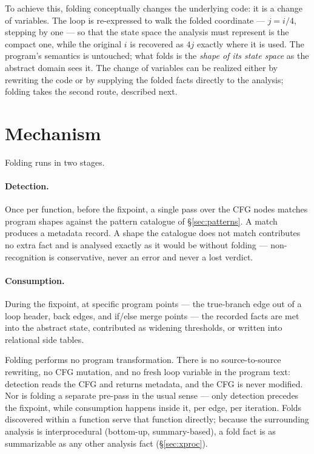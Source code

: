\documentclass[11pt,a4paper]{article}
\begin{document}
To achieve this, folding conceptually changes the underlying code: it is a change of
variables. The loop is re-expressed to walk the folded coordinate --- $j = i/4$, stepping
by one --- so that the state space the analysis must represent is the compact one, while
the original $i$ is recovered as $4j$ exactly where it is used. The program's semantics is
untouched; what folds is the \emph{shape of its state space} as the abstract domain sees
it. The change of variables can be realized either by rewriting the code or by supplying
the folded facts directly to the analysis; folding takes the second route, described next.

\section{Mechanism}
\label{sec:mechanism}

Folding runs in two stages.

\paragraph{Detection.} Once per function, before the fixpoint, a single pass over the CFG
nodes matches program shapes against the pattern catalogue of \S\ref{sec:patterns}. A
match produces a metadata record. A shape the catalogue does not match contributes no
extra fact and is analysed exactly as it would be without folding --- non-recognition is
conservative, never an error and never a lost verdict.

\paragraph{Consumption.} During the fixpoint, at specific program points --- the
true-branch edge out of a loop header, back edges, and if/else merge points --- the
recorded facts are met into the abstract state, contributed as widening thresholds, or
written into relational side tables.

Folding performs no program transformation. There is no source-to-source rewriting, no
CFG mutation, and no fresh loop variable in the program text: detection reads the CFG
and returns metadata, and the CFG is never modified. Nor is
folding a separate pre-pass in the usual sense --- only detection precedes the fixpoint,
while consumption happens inside it, per edge, per iteration. Folds discovered within a
function serve that function directly; because the surrounding analysis is
interprocedural (bottom-up, summary-based), a fold fact is as summarizable as any other
analysis fact (\S\ref{sec:xproc}).
\end{document}
